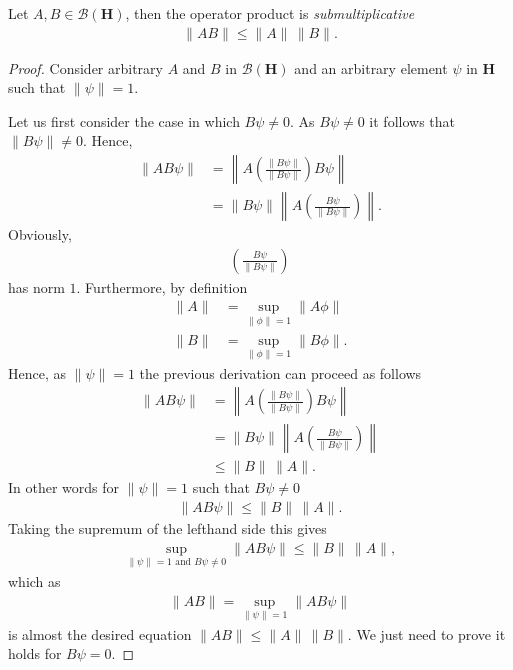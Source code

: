 \begin{lemma}
    \label{lmm:lemma-2}
    \leanok
    Let $A, B \in \mathcal{B}(\mathbf{H})$, then the operator product is \textit{submultiplicative}
    \begin{align}
        \|AB\| \le \|A\| \, \|B\|.
    \end{align}
\end{lemma}
\begin{proof}
    \leanok
Consider arbitrary $A$ and $B$ in $\mathcal{B}(\mathbf{H})$ and an arbitrary element $\psi$ in $\mathbf{H}$ such that $\|\psi\| = 1$.

Let us first consider the case in which $B\psi \neq 0$. As $B\psi \neq 0$ it follows that $\|B\psi\| \neq 0$. Hence,
\begin{align}
    \|AB\psi\| &= \left\| A \left( \frac{\|B\psi\|}{\|B\psi\|} \right) B\psi \right\| \\
               &= \|B\psi\| \left\| A \left( \frac{B\psi}{\|B\psi\|} \right) \right\|.
\end{align}
Obviously,
\begin{align}
    \left( \frac{B\psi}{\|B\psi\|} \right)
\end{align}
has norm $1$. Furthermore, by definition
\begin{align}
    \|A\| &= \sup\limits_{\|\phi\| = 1} \|A\phi\| \\
    \|B\| &= \sup\limits_{\|\phi\| = 1} \|B\phi\|.
\end{align}
Hence, as $\|\psi\| = 1$ the previous derivation can proceed as follows
\begin{align}
    \|AB\psi\| &= \left\| A \left( \frac{\|B\psi\|}{\|B\psi\|} \right) B\psi \right\| \\
               &= \|B\psi\| \left\| A \left( \frac{B\psi}{\|B\psi\|} \right) \right\| \\
               &\le \|B\| \, \|A\|.
\end{align}
In other words for $\|\psi\| = 1$ such that $B\psi \neq 0$
\begin{align}
    \|AB\psi\| \le \|B\| \, \|A\|.
\end{align}
Taking the supremum of the lefthand side this gives
\begin{align}
    \sup\limits_{\|\psi\| = 1 \text{ and } B\psi \neq 0} \|AB\psi\| \le \|B\| \, \|A\|,
\end{align}
which as
\begin{align}
    \|AB\| = \sup\limits_{\|\psi\| = 1} \|AB\psi\|
\end{align}
is almost the desired equation $\|AB\| \le \|A\| \,\|B\|$. We just need to prove it holds for $B\psi = 0$.


\end{proof}
